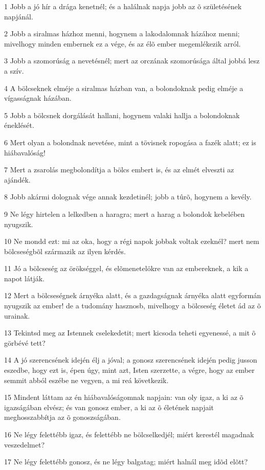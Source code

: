 \par 1 Jobb a jó hír a drága kenetnél; és a halálnak napja jobb az õ születésének napjánál.
\par 2 Jobb a siralmas házhoz menni, hogynem a lakodalomnak házához menni; mivelhogy minden embernek ez a vége, és az élõ ember megemlékezik arról.
\par 3 Jobb a szomorúság a nevetésnél; mert az orczának szomorúsága által jobbá lesz a szív.
\par 4 A bölcseknek elméje a siralmas házban van, a bolondoknak pedig elméje a vígasságnak házában.
\par 5 Jobb a bölcsnek dorgálását hallani, hogynem valaki hallja a bolondoknak éneklését.
\par 6 Mert olyan a bolondnak nevetése, mint a tövisnek ropogása a fazék alatt; ez is hiábavalóság!
\par 7 Mert a zsarolás megbolondítja a bölcs embert is, és az elmét elveszti az ajándék.
\par 8 Jobb akármi dolognak vége annak kezdetinél; jobb a tûrõ, hogynem a kevély.
\par 9 Ne légy hirtelen a lelkedben a haragra; mert a harag a bolondok kebelében nyugszik.
\par 10 Ne mondd ezt: mi az oka, hogy a régi napok jobbak voltak ezeknél? mert nem bölcseségbõl származik az ilyen kérdés.
\par 11 Jó a bölcseség az örökséggel, és elõmenetelökre van az embereknek, a kik a napot látják.
\par 12 Mert a bölcseségnek árnyéka alatt, és a gazdagságnak árnyéka alatt egyformán nyugszik az ember! de a tudomány hasznosb, mivelhogy a bölcseség életet ád az õ urainak.
\par 13 Tekintsd meg az Istennek cselekedetit; mert kicsoda teheti egyenessé, a mit õ görbévé tett?
\par 14 A jó szerencsének idején élj a jóval; a gonosz szerencsének idején pedig jusson eszedbe, hogy ezt is, épen úgy, mint azt, Isten szerzette, a végre, hogy az ember semmit abból eszébe ne vegyen, a mi reá következik.
\par 15 Mindent láttam az én hiábavalóságomnak napjain: van oly igaz, a ki az õ igazságában elvész; és van gonosz ember, a ki az õ életének napjait meghosszabbítja az õ gonoszságában.
\par 16 Ne légy felettébb igaz, és felettébb ne bölcselkedjél; miért kerestél magadnak veszedelmet?
\par 17 Ne légy felettébb gonosz, és ne légy balgatag; miért halnál meg idõd elõtt?
